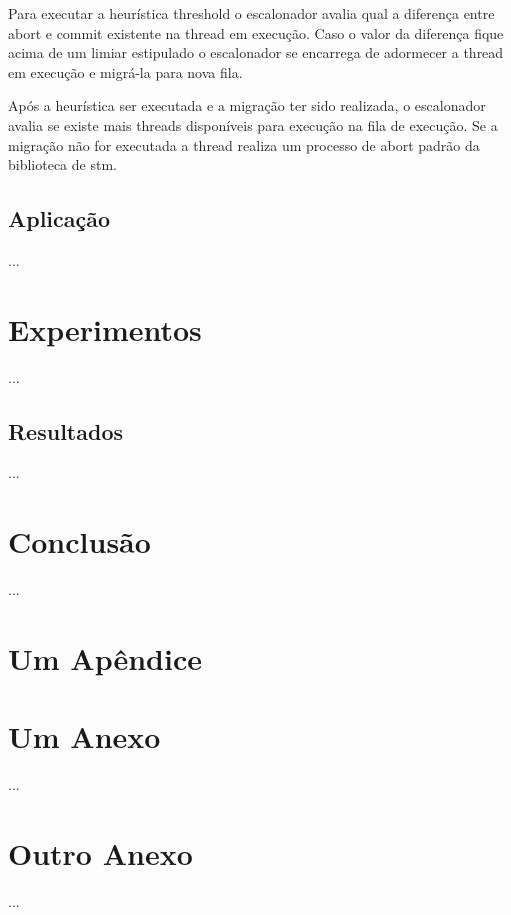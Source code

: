 \documentclass[diss,capa]{texufpel}
\begin{document}
Para executar a heurística threshold o escalonador avalia qual a diferença entre abort e commit existente na thread em execução. Caso o valor da diferença fique acima de um limiar estipulado o escalonador se encarrega de adormecer a thread em execução e migrá-la para nova fila.

Após a heurística ser executada e a migração ter sido realizada, o escalonador avalia se existe mais threads disponíveis para execução na fila de execução. Se a migração não for executada a thread realiza um processo de abort padrão da biblioteca de stm.

\section{\textbf{Aplicação}}

...

\chapter{Experimentos}

...

\section{Resultados}

...

\chapter{Conclusão}

...




 

\apendices
\chapter{Um Apêndice}

\anexos
\chapter{Um Anexo}

...

\chapter{Outro Anexo}

...

\end{document}
